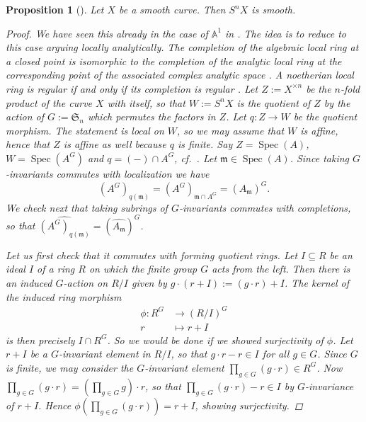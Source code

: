 \documentclass[12pt,a4paper]{amsart}
\theoremstyle{plain}
\newtheorem{prop}[thm]{Proposition}
\theoremstyle{definition}
\theoremstyle{remark}
\begin{document}
\begin{prop}[{\cite[Proposition 3.1]{rot16}}]
  Let $X$ be a smooth curve.
  Then $S^{n}X$ is smooth.

  \begin{proof}
    We have seen this already in the case of $\mathbb{A}^{1}$ in .
    The idea is to reduce to this case arguing locally analytically.
    The completion of the algebraic local ring at a closed point is isomorphic to the completion of the analytic local ring at the corresponding point of the associated complex analytic space \cite[Proposition 3]{ser56}.
    A noetherian local ring is regular if and only if its completion is regular \cite[\href{https://stacks.math.columbia.edu/tag/07NY}{Tag 07NY}]{stacks-project}.
    Let $Z := X^{\times n}$ be the $n$-fold product of the curve $X$ with itself, so that $W := S^{n}X$ is the quotient of $Z$ by the action of $G := \mathfrak{S}_{n}$ which permutes the factors in $Z$.
    Let $q \colon Z \to W$ be the quotient morphism.
    The statement is local on $W$, so we may assume that $W$ is affine, hence that $Z$ is affine as well because $q$ is finite.
    Say $Z = \operatorname{Spec}(A)$, $W = \operatorname{Spec}(A^{G})$ and $q = (-) \cap A^{G}$, cf.~.
    Let $\mathfrak{m} \in \operatorname{Spec}(A)$.
    Since taking $G$-invariants commutes with localization \cite[Exercise 5.12]{am69} we have
    \[ (A^{G})_{q(\mathfrak{m})} = (A^{G})_{\mathfrak{m} \cap A^{G}} = (A_{\mathfrak{m}})^{G}. \]
    We check next that taking subrings of $G$-invariants commutes with completions, so that $\widehat{(A^{G})_{q(\mathfrak{m})}} = (\widehat{A_{\mathfrak{m}}})^{G}$.

    Let us first check that it commutes with forming quotient rings.
    Let $I \subseteq R$ be an ideal $I$ of a ring $R$ on which the finite group $G$ acts from the left.
    Then there is an induced $G$-action on $R/I$ given by $g\cdot (r + I) := (g\cdot r) + I$.
    The kernel of the induced ring morphism
    \begin{align*}
      \phi \colon R^{G} & \longrightarrow (R/I)^{G} \\
      r & \longmapsto r + I
    \end{align*}
    is then precisely $I\cap R^{G}$.
    So we would be done if we showed surjectivity of $\phi$.
    Let $r + I$ be a $G$-invariant element in $R/I$, so that $g \cdot r - r \in I$ for all $g \in G$.
    Since $G$ is finite, we may consider the $G$-invariant element $\prod_{g \in G} (g\cdot r) \in R^{G}$.
    Now $\prod_{g \in G}(g \cdot r) = (\prod_{g \in G} g) \cdot r$, so that $\prod_{g \in G}(g\cdot r) - r \in I$ by $G$-invariance of $r + I$.
    Hence $\phi(\prod_{g \in G}(g \cdot r)) = r + I$, showing surjectivity.


\end{proof}
\end{prop}
\end{document}
